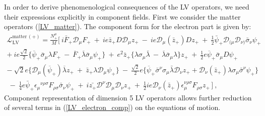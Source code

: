 \documentclass[12pt]{revtex4}
\begin{document}
In order to derive phenomenological consequences of the LV operators, 
we need their expressions explicitly in component fields. 
First we consider the matter operators (\ref{LV_matter}).
The component form for the electron part is given by: 
\begin{gather}
\nonumber
  \mathcal{L}_{\mathrm{LV}}^{\mathrm{matter\,(+)}} 
 = \frac{N_+^\mu}{M} \Big[~
    i \bar{F}_+ \mathcal{D}_\mu F_+ ~+~
    i e \bar{z}_+ D \mathcal{D}_\mu z_+ ~-~
    i e \mathcal{D}_\mu(\bar{z}_+) D z_+ 
~+~ 
  \frac{1}{2}\bar{\psi}_+\mathcal{D}_{(\mu}\mathcal{D}_{\nu)}
               \bar{\sigma}_\nu \psi_+ 
\nonumber \\
  + ~ 
    i e \frac{\sqrt{2}}{2} \Big\{
               \overline{\psi}_+\bar\sigma_\mu\lambda F_+ 
       ~-~
               \overline{F}_+\overline{\lambda} \bar\sigma_\mu \psi_+
                         \Big\}  ~+~
    e^2 \bar{z}_+ \Big\{
               \lambda\sigma_\mu\bar{\lambda} 
       ~-~
               \overline{\lambda}\bar\sigma_\mu\lambda 
                       \Big\} z_+ 
~+~ 
    \frac{1}{2} e \overline{\psi}_+\bar\sigma_\mu D\psi_+
\nonumber \\
\nonumber
 -~ 
   \sqrt{2} e \Big\{ 
                     \mathcal{D}_\mu(\overline{\psi}_+)\overline{\lambda} z_+ 
     ~+~ 
                     \bar{z}_+ \lambda \mathcal{D}_\mu \psi_+ 
                     \Big\} 
    ~-~ 
    \frac{\sqrt{2}}{2} e \Big\{ 
                      \overline{\psi}_+\bar\sigma^\nu\sigma_\mu 
                     \bar{\lambda}\mathcal{D}_\nu z_+ +
                     \mathcal{D}_\nu(\bar{z}_+)\lambda\sigma_\mu
                     \bar{\sigma}^\nu \psi_+
                     \Big\}
   \\
  ~ -~
  \frac{1}{4} e \bar{\psi}_+\epsilon_\mu{}^{\nu\rho\sigma}
              F_{\rho\sigma} \bar{\sigma}_\nu \psi_+
   ~+~
  i \bar{z_+} \mathcal{D}^\nu \mathcal{D}_\mu \mathcal{D}_\nu z_+ 
   ~+~
   \frac{1}{2} i e \mathcal{D}_\nu (\bar{z}_+) \epsilon_\mu^{\nu\rho\sigma}
              F_{\rho\sigma} z_+ \, 
   \Big] ~,
\label{LV_electron_comp}
\end{gather}
Component representation  of dimension 5 LV 
operators allows further reduction of several terms in (\ref{LV_electron_comp})
on the equations of motion.
\end{document}
